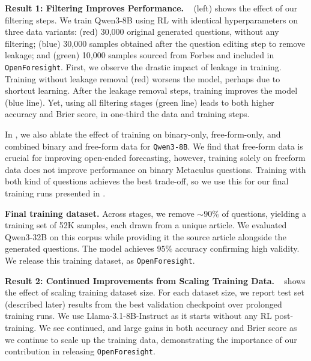 \documentclass{article} %
\newcommand{\ourdataset}{\texttt{OpenForesight}}
\newcommand{\contribution}[1]{\textcolor{myblue}{\textbf{#1}}}
\begin{document}
 \contribution{Result 1: Filtering Improves Performance.}  ~ (left) shows the effect of our filtering steps. We train Qwen3-8B using RL with identical hyperparameters on three data variants: (red) 30,000 original generated questions, without any filtering; (blue) 30,000 samples obtained after the question editing step to remove leakage; and (green) 10,000 samples sourced from Forbes and included in \ourdataset. First, we observe the drastic impact of leakage in training. Training without leakage removal (red) worsens the model, perhaps due to shortcut learning. After the leakage removal steps, training improves the model (blue line). Yet, using all filtering stages (green line) leads to both higher accuracy and Brier score, in one-third the data and training steps. \vspace{0.15cm}

In , we also ablate the effect of training on binary-only, free-form-only, and combined binary and free-form data for \texttt{Qwen3-8B}. We find that free-form data is crucial for improving open-ended forecasting, however, training solely on freeform data does not improve performance on binary Metaculus questions. Training with both kind of questions achieves the best trade-off, so we use this for our final training runs presented in . 

\textbf{Final training dataset.} Across stages, we remove $\sim90\%$ of questions, yielding a training set of 52K samples, each drawn from a unique article. We evaluated Qwen3-32B on this corpus while providing it the source article alongside the generated questions. The model achieves $95\%$ accuracy confirming high validity. We release this training dataset, as {\ourdataset}.

 \contribution{Result 2: Continued Improvements from Scaling Training Data.}  ~ shows the effect of scaling training dataset size. For each dataset size, we report test set (described later) results from the best validation checkpoint over prolonged training runs. We use Llama-3.1-8B-Instruct as it starts without any RL post-training. We see continued, and large gains in both accuracy and Brier score as we continue to scale up the training data, demonstrating the importance of our contribution in releasing \ourdataset.
\end{document}
